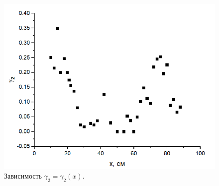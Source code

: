 \documentclass[a4paper,12pt]{article}
\begin{document}
\begin{figure}[h]
\includegraphics[scale=0.8]{5.png}
\centering
\caption{Зависимость $\gamma_2 = \gamma_2(x)$.}
\end{figure}
\end{document}
